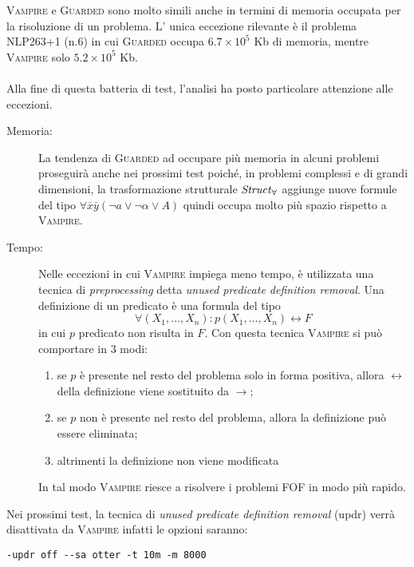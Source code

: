 \textsc{Vampire} e \textsc{Guarded} sono molto simili anche in termini di memoria occupata per la risoluzione di un problema.
L' unica eccezione rilevante 
è il problema NLP263+1 (n.6) in cui \textsc{Guarded} occupa $6.7\times10^5$ Kb di memoria, mentre \textsc{Vampire} solo $5.2\times10^5$ Kb.\\\\
Alla fine di questa batteria di test, l'analisi ha posto particolare attenzione alle eccezioni. 
\begin{description}
    \item[Memoria:] La tendenza di \textsc{Guarded} ad occupare più memoria in alcuni problemi proseguirà anche nei prossimi test
    poiché, in problemi complessi e di grandi dimensioni, la trasformazione strutturale 
    $\text{\emph{Struct}}_\forall$ aggiunge nuove formule del tipo $\forall\bar{x}\bar{y}(\lnot a \lor \lnot\alpha \lor A)$ 
    quindi occupa molto più spazio rispetto a \textsc{Vampire}.
    \item[Tempo:] Nelle eccezioni in cui \textsc{Vampire} impiega meno tempo, è utilizzata
    una tecnica di \emph{preprocessing} detta \emph{unused predicate definition removal}.
    Una definizione di un predicato è una formula del tipo 
    \[\forall(X_1,\dots,X_n) : p(X_1, \dots, X_n) \leftrightarrow F\]
    in cui $p$ predicato non risulta in $F$. 
    Con questa tecnica \textsc{Vampire} si può comportare in 3 modi:
    \begin{enumerate}
        \item se $p$ è presente nel resto del problema solo in forma positiva, allora $\leftrightarrow$ della definizione
        viene sostituito da $\rightarrow$;
        \item se $p$ non è presente nel resto del problema, allora la definizione può essere eliminata;
        \item altrimenti la definizione non viene modificata
    \end{enumerate}
    In tal modo \textsc{Vampire} riesce a risolvere i problemi FOF in modo più rapido.
\end{description}

Nei prossimi test, la tecnica di \emph{unused predicate definition removal} (updr) 
verrà disattivata da \textsc{Vampire} infatti le opzioni saranno:
\begin{center}
    \verb|-updr off --sa otter -t 10m -m 8000|    
\end{center}

